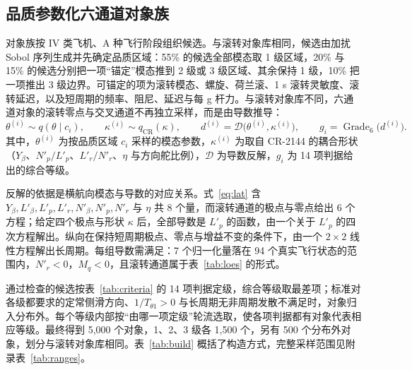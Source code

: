 \documentclass[UTF8,a4paper,11pt,fontset=fandol,scheme=plain]{ctexart}
\begin{document}
\subsection{品质参数化六通道对象族}
\label{sec:family}
对象族按 IV 类飞机、A 种飞行阶段组织候选。与滚转对象库相同，候选由加扰 Sobol 序列生成并先确定品质区域：55\% 的候选全部模态取 1 级区域，20\% 与 15\% 的候选分别把一项“锚定”模态推到 2 级或 3 级区域、其余保持 1 级，10\% 把一项推出 3 级边界。可锚定的项为滚转模态、螺旋、荷兰滚、1 s 滚转灵敏度、滚转延迟，以及短周期的频率、阻尼、延迟与每 g 杆力。与滚转对象库不同，六通道对象的滚转零点与交叉通道不再独立采样，而是由导数推导：
\begin{equation}
\theta^{(i)}\sim q(\theta\mid c_i),\qquad \kappa^{(i)}\sim q_{\mathrm{CR}}(\kappa),\qquad d^{(i)}=\mathcal D\bigl(\theta^{(i)},\kappa^{(i)}\bigr),\qquad g_i=\operatorname{Grade}_6\bigl(d^{(i)}\bigr).
\end{equation}
其中，\(\theta^{(i)}\) 为按品质区域 \(c_i\) 采样的模态参数，\(\kappa^{(i)}\) 为取自 CR-2144 的耦合形状（\(Y_\beta\)、\(N'_p/L'_p\)、\(L'_r/N'_r\)、\(\eta\) 与方向舵比例），\(\mathcal D\) 为导数反解，\(g_i\) 为 14 项判据给出的综合等级。

反解的依据是横航向模态与导数的对应关系。式~\eqref{eq:lat} 含 \(Y_\beta,L'_\beta,L'_p,L'_r,N'_\beta,N'_p,N'_r\) 与 \(\eta\) 共 8 个量，而滚转通道的极点与零点给出 6 个方程；给定四个极点与形状 \(\kappa\) 后，全部导数是 \(L'_p\) 的函数，由一个关于 \(L'_p\) 的四次方程解出。纵向在保持短周期极点、零点与增益不变的条件下，由一个 \(2\times2\) 线性方程解出长周期。每组导数需满足：7 个归一化量落在 94 个真实飞行状态的范围内，\(N'_r<0\)，\(M_q<0\)，且滚转通道属于表~\ref{tab:loes} 的形式。

通过检查的候选按表~\ref{tab:criteria} 的 14 项判据定级，综合等级取最差项；标准对各级都要求的定常侧滑方向、\(1/T_{\theta1}>0\) 与长周期无非周期发散不满足时，对象归入分布外。每个等级内部按“由哪一项定级”轮流选取，使各项判据都有对象代表相应等级。最终得到 5,000 个对象，1、2、3 级各 1,500 个，另有 500 个分布外对象，划分与滚转对象库相同。表~\ref{tab:build} 概括了构造方式，完整采样范围见附录表~\ref{tab:ranges}。
\end{document}
